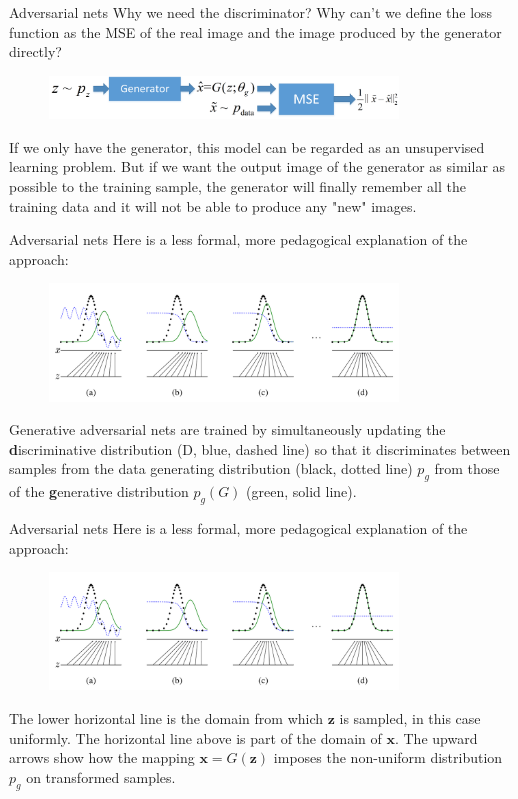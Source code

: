 \documentclass[10pt]{beamer}
\begin{document}
	\begin{frame}{Adversarial nets}
		Why we need the discriminator? Why can't we define the loss function as the MSE of the real image and the image produced by the generator directly?
		\begin{figure}
			\includegraphics[width=25em]{figures/GAN-hypothesis-structure.png}
		\end{figure}
		If we only have the generator, this model can be regarded as an unsupervised learning problem. But if we want the output image of the generator as similar as possible to the training sample, the generator will finally remember all the training data and it will not be able to produce any "new" images.
	\end{frame}

	\begin{frame}[t]{Adversarial nets}
		Here is a less formal, more pedagogical explanation of the approach:
		\begin{figure}
			\includegraphics[width=25em]{figures/GAN-pedagogical-explanation.png}
		\end{figure}
		Generative adversarial nets are trained by simultaneously updating the \textbf{d}iscriminative distribution (D, blue, dashed line) so that it discriminates between samples from the data generating distribution (black, dotted line) $p_g$ from those of the \textbf{g}enerative distribution $p_g(G)$ (green, solid line). 
	\end{frame}
	
	\begin{frame}[t]{Adversarial nets}
		Here is a less formal, more pedagogical explanation of the approach:
		\begin{figure}
			\includegraphics[width=25em]{figures/GAN-pedagogical-explanation.png}
		\end{figure}
	 	The lower horizontal line is the domain from which $\bm{z}$ is sampled, in this case uniformly. The horizontal line above is part of the domain of $\bm{x}$. The upward arrows show how the mapping $\bm{x}=G(\bm{z})$ imposes the non-uniform distribution $p_g$ on transformed samples.
	\end{frame}
\end{document}
